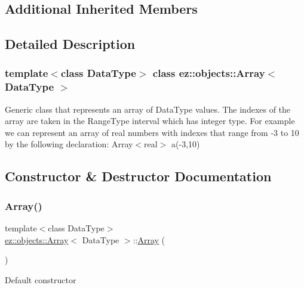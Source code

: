 \subsection*{Additional Inherited Members}


\subsection{Detailed Description}
\subsubsection*{template$<$class Data\+Type$>$\newline
class ez\+::objects\+::\+Array$<$ Data\+Type $>$}

Generic class that represents an array of Data\+Type values. The indexes of the array are taken in the Range\+Type interval which has integer type. For example we can represent an array of real numbers with indexes that range from -\/3 to 10 by the following declaration\+: {\ttfamily Array$<$real$>$ a(-\/3,10)} 

\subsection{Constructor \& Destructor Documentation}
\mbox{\label{classez_1_1objects_1_1Array_a88ec7bab9f66c8fe7d97b4782a39ee84}} 
\subsubsection{\texorpdfstring{Array()}{Array()}\hspace{0.1cm}{\footnotesize\ttfamily [1/5]}}
{\footnotesize\ttfamily template$<$class Data\+Type$>$ \\
\hyperlink{classez_1_1objects_1_1Array}{ez\+::objects\+::\+Array}$<$ Data\+Type $>$\+::\hyperlink{classez_1_1objects_1_1Array}{Array} (\begin{DoxyParamCaption}{ }\end{DoxyParamCaption})\hspace{0.3cm}{\ttfamily [inline]}}

Default constructor \mbox{\label{classez_1_1objects_1_1Array_ab389febcc8d618c3b660fac1236898cb}} 
